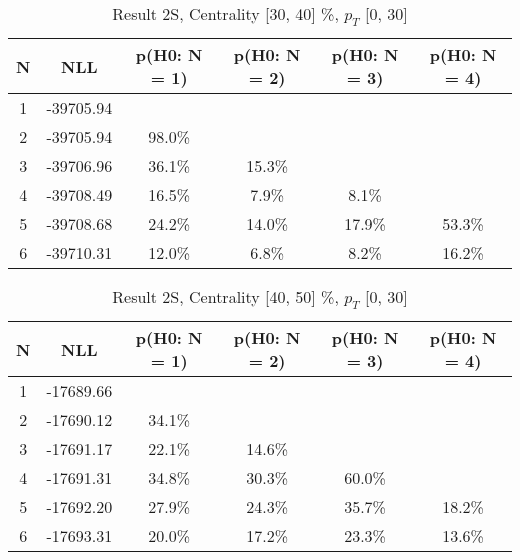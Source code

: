 \begin{table}[htb]
	\begin{center}
	\caption{Result 2S, Centrality [30, 40] \%, $p_{T}$ [0, 30] \GeV
}
{\footnotesize\renewcommand{\arraystretch}{1.4}
		\begin{tabular}{cc||>{\columncolor[gray]{0.8}}cccc}
			N & NLL & p(H0: N = 1) & p(H0: N = 2) & p(H0: N = 3) & p(H0: N = 4)\\ 
		\hline
1 & -39705.94 & & & & \\
2 & -39705.94 & 98.0\% & & & \\
3 & -39706.96 & 36.1\% & 15.3\% & & \\
4 & -39708.49 & 16.5\% & 7.9\% & 8.1\% & \\
5 & -39708.68 & 24.2\% & 14.0\% & 17.9\% & 53.3\% \\
6 & -39710.31 & 12.0\% & 6.8\% & 8.2\% & 16.2\% \\
	\end{tabular}
		\label{tab:lab}
	}
	\end{center}\end{table}

\begin{table}[htb]
	\begin{center}
	\caption{Result 2S, Centrality [40, 50] \%, $p_{T}$ [0, 30] \GeV
}
{\footnotesize\renewcommand{\arraystretch}{1.4}
		\begin{tabular}{cc||>{\columncolor[gray]{0.8}}cccc}
			N & NLL & p(H0: N = 1) & p(H0: N = 2) & p(H0: N = 3) & p(H0: N = 4)\\ 
		\hline
1 & -17689.66 & & & & \\
2 & -17690.12 & 34.1\% & & & \\
3 & -17691.17 & 22.1\% & 14.6\% & & \\
4 & -17691.31 & 34.8\% & 30.3\% & 60.0\% & \\
5 & -17692.20 & 27.9\% & 24.3\% & 35.7\% & 18.2\% \\
6 & -17693.31 & 20.0\% & 17.2\% & 23.3\% & 13.6\% \\
	\end{tabular}
		\label{tab:lab}
	}
	\end{center}\end{table}

